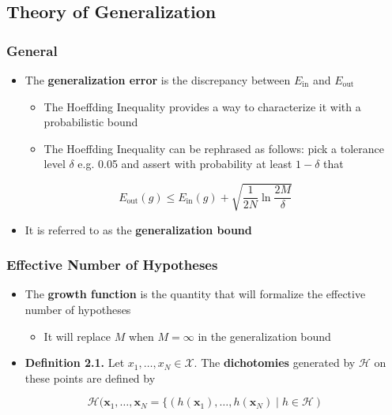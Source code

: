 \documentclass[11pt]{article}
\begin{document}
\subsection{Theory of Generalization}
\label{sec:org0feb083}
\subsubsection{General}
\label{sec:orgfe62362}
\begin{itemize}
\item The \textbf{generalization error} is the discrepancy between \(E_\text{in}\) and \(E_\text{out}\)
\begin{itemize}
\item The Hoeffding Inequality provides a way to characterize it with a probabilistic bound
\item The Hoeffding Inequality can be rephrased as follows: pick a tolerance level \(\delta\) e.g. 0.05 and assert with probability at least \(1-\delta\) that
\end{itemize}
\end{itemize}
\begin{equation}
  E_\text{out}(g) \leq E_\text{in}(g) + \sqrt{\frac1{2N} \ln \frac{2M}\delta} 
\end{equation}
\begin{itemize}
\item It is referred to as the \textbf{generalization bound}
\end{itemize}

\subsubsection{Effective Number of Hypotheses}
\label{sec:org19dc362}
\begin{itemize}
\item The \textbf{growth function} is the quantity that will formalize the effective number of hypotheses
\begin{itemize}
\item It will replace \(M\) when \(M=\infty\) in the generalization bound
\end{itemize}

\item \textbf{Definition 2.1.} Let \(x_1, \dots, x_N \in \mathcal X\). The \textbf{dichotomies} generated by \(\mathcal H\) on these points are defined by
\end{itemize}
\begin{equation}
  \mathcal H (\pmb x_1, \dots, \pmb x_N= \{ (h(\pmb x_1), \dots, h(\pmb x_N ) \mid h \in \mathcal H)
\end{equation}
\end{document}

